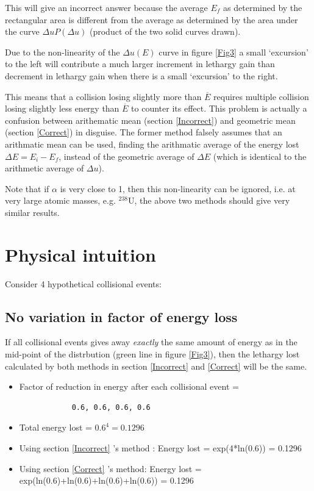 \documentclass[a4paper, 12pt]{article}
\begin{document}
	This will give an incorrect answer because the average $E_f$ as determined by the rectangular area is different from the average as determined by the area under the curve $ \Delta u P(\Delta u)$ (product of the two solid curves drawn).

	Due to the non-linearity of the $\Delta u(E)$ curve in figure \ref{Fig3} a small `excursion' to the left will contribute a much larger increment in lethargy gain than decrement in lethargy gain when there is a small `excursion' to the right.
	

	This means that a collision losing slightly more than $\overline{E}$ requires multiple collision losing slightly less energy than $\overline{E}$ to counter its effect.
	This problem is actually a confusion between arithematic mean (section \ref{Incorrect}) and geometric mean (section \ref{Correct}) in disguise. The former method falsely assumes that an arithmatic mean can be used, finding the arithmatic average of the energy lost $\Delta E = E_i-E_f$, instead of the geometric average of $\Delta E$ (which is identical to the arithmetic average of $\Delta u$).

	Note that if $\alpha$ is very close to 1, then this non-linearity can be ignored, i.e. at very large atomic masses, e.g. ${}^{238}$U, the above two methods should give very similar results.

\section{Physical intuition}
	Consider 4 hypothetical collisional events:

	\subsection{No variation in factor of energy loss}
	If all collisional events gives away \emph{exactly} the same amount of energy as in the mid-point of the distrbution (green line in figure \ref{Fig3}), then the lethargy lost calculated by both methods in section \ref{Incorrect} and \ref{Correct} will be the same.
	\begin{itemize}
		\item Factor of reduction in energy after each collisional event = \begin{verbatim}
			0.6, 0.6, 0.6, 0.6
		\end{verbatim}
		\item Total energy lost = $0.6^4 =  0.1296$
		\item Using section \ref{Incorrect} 's method : Energy lost = exp(4*ln(0.6)) = 0.1296
		\item Using section \ref{Correct} 's method: Energy lost = exp(ln(0.6)+ln(0.6)+ln(0.6)+ln(0.6)) = 0.1296
	\end{itemize}
	
\end{document}
